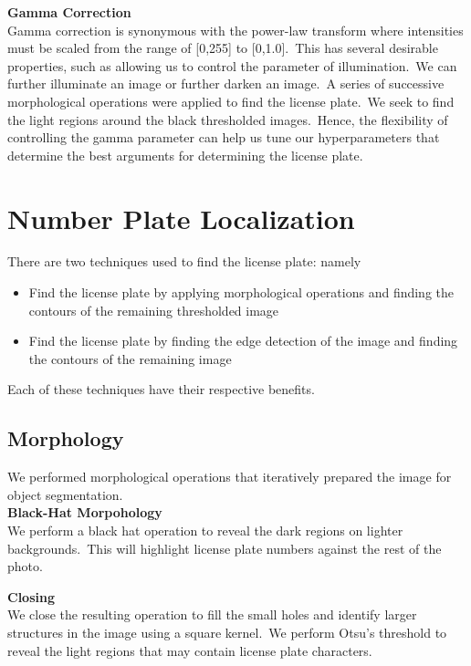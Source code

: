 \documentclass[a4paper,twoside,10pt]{report}
\begin{document}
\textbf{Gamma Correction}\\
Gamma correction is synonymous with the power-law transform where intensities must be scaled from the range of [0,255] to [0,1.0].\ 
This has several desirable properties, such as allowing us to control the parameter of illumination.\ 
We can further illuminate an image or further darken an image.\ 
A series of successive morphological operations were applied to find the license plate.\ 
We seek to find the light regions around the black thresholded images.\ 
Hence, the flexibility of controlling the gamma parameter can help us tune our hyperparameters that determine the best arguments for determining the license plate.

\section{Number Plate Localization}
There are two techniques used to find the license plate: namely 
\begin{itemize}
  \item Find the license plate by applying morphological operations and finding the contours of the remaining thresholded image
  \item Find the license plate by finding the edge detection of the image and finding the contours of the remaining image 
\end{itemize}

Each of these techniques have their respective benefits. 
\subsection{Morphology}

We performed morphological operations that iteratively prepared the image for object segmentation.  \\[3pt]
\textbf{Black-Hat Morpohology}\\
We perform a black hat operation to reveal the dark regions on lighter backgrounds.\ 
This will highlight license plate numbers against the rest of the photo.\
 
\textbf{Closing}\\
We close the resulting operation to fill the small holes and identify larger structures in the image using a square kernel.\ 
We perform Otsu's threshold to reveal the light regions that may contain license plate characters.
\end{document}
